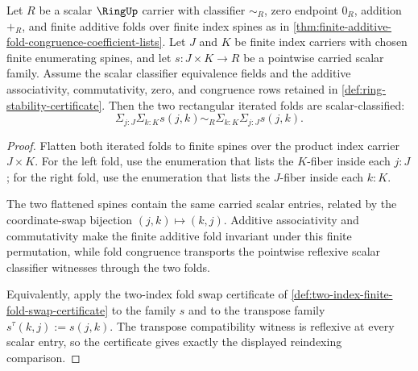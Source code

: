 \begin{lemma}
\label{lem:rectangular-scalar-fold-reindexing}
Let $R$ be a scalar $\RingUp$ carrier with classifier $\sim_R$, zero endpoint
$0_R$, addition $+_R$, and finite additive folds over finite index spines as in
\autoref{thm:finite-additive-fold-congruence-coefficient-lists}. Let $J$ and $K$ be finite index
carriers with chosen finite enumerating spines, and let
$s:J\times K\to R$ be a pointwise carried scalar family. Assume the scalar
classifier equivalence fields and the additive associativity, commutativity,
zero, and congruence rows retained in \autoref{def:ring-stability-certificate}.
Then the two rectangular iterated folds are scalar-classified:
$$
\Sigma_{j:J}\Sigma_{k:K}s(j,k)
\sim_R
\Sigma_{k:K}\Sigma_{j:J}s(j,k).
$$
\end{lemma}
\begin{proof}
Flatten both iterated folds to finite spines over the product index carrier
$J\times K$. For the left fold, use the enumeration that lists the $K$-fiber
inside each $j:J$; for the right fold, use the enumeration that lists the
$J$-fiber inside each $k:K$.

The two flattened spines contain the same carried scalar entries, related by the
coordinate-swap bijection $(j,k)\mapsto(k,j)$. Additive associativity and
commutativity make the finite additive fold invariant under this finite
permutation, while fold congruence transports the pointwise reflexive scalar
classifier witnesses through the two folds.

Equivalently, apply the two-index fold swap certificate of
\autoref{def:two-index-finite-fold-swap-certificate} to the family $s$ and to
the transpose family $s^{\tau}(k,j):=s(j,k)$. The transpose compatibility
witness is reflexive at every scalar entry, so the certificate gives exactly the
displayed reindexing comparison.
\end{proof}
